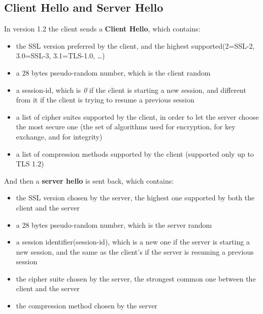 \subsection{Client Hello and Server Hello}
In version 1.2 the client sends a \textbf{Client Hello}, which
contains:
\begin{itemize}
  \item the SSL version preferred by the client, and the highest
    supported(2=SSL-2, 3.0=SSL-3, 3.1=TLS-1.0, \dots)
  \item a 28 bytes pseudo-random number, which is the client random
  \item a session-id, which is \textit{0} if the client is starting a
    new session, and different from it if the client is trying to
    resume a previous session
  \item a list of cipher suites supported by the client, in order to 
    let the server choose the most secure one (the set of algorithms
    used for encryption, for key exchange, and for integrity)
  \item a list of compression methods supported by the client
    (supported only up to TLS 1.2)
\end{itemize}

And then a \textbf{server hello} is sent back, which contains:
\begin{itemize}
  \item the SSL version chosen by the server, the highest one
    supported by both the client and the server
  \item a 28 bytes pseudo-random number, which is the server random
  \item a session identifier(session-id), which is a new one if the
    server is starting a new session, and the same as the client's if
    the server is resuming a previous session
  \item the cipher suite chosen by the server, the strongest common
    one between the client and the server
  \item the compression method chosen by the server
\end{itemize}


